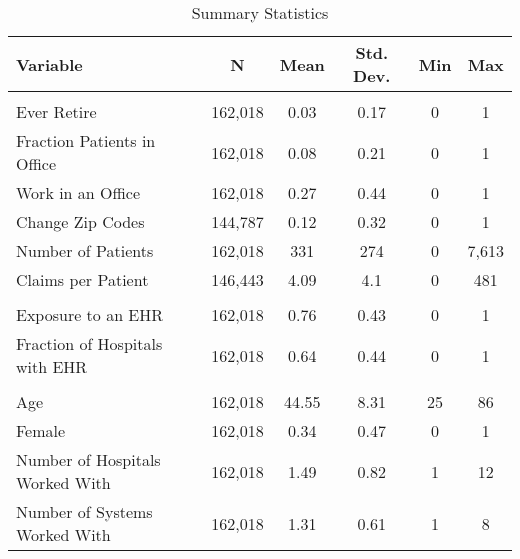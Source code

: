 


\begin{table}[ht]

\caption{Summary Statistics \label{tab:sumstats}}
\centering
\begin{tabular}[t]{lccccc}
\toprule
Variable & N & Mean & Std. Dev. & Min & Max\\
\midrule
\addlinespace[0.3em]
\multicolumn{6}{l}{\textbf{Outcomes}}\\
\hspace{1em}Ever Retire & 162,018 & 0.03 & 0.17 & 0 & 1\\
\hspace{1em}Fraction Patients in Office & 162,018 & 0.08 & 0.21 & 0 & 1\\
\hspace{1em}Work in an Office & 162,018 & 0.27 & 0.44 & 0 & 1\\
\hspace{1em}Change Zip Codes & 144,787 & 0.12 & 0.32 & 0 & 1\\
\hspace{1em}Number of Patients & 162,018 & 331 & 274 & 0 & 7,613\\
\hspace{1em}Claims per Patient & 146,443 & 4.09 & 4.1 & 0 & 481\\
\addlinespace[0.3em]
\multicolumn{6}{l}{\textbf{Treatment}}\\
\hspace{1em}Exposure to an EHR & 162,018 & 0.76 & 0.43 & 0 & 1\\
\hspace{1em}Fraction of Hospitals with EHR & 162,018 & 0.64 & 0.44 & 0 & 1\\
\addlinespace[0.3em]
\multicolumn{6}{l}{\textbf{Characteristics}}\\
\hspace{1em}Age & 162,018 & 44.55 & 8.31 & 25 & 86\\
\hspace{1em}Female & 162,018 & 0.34 & 0.47 & 0 & 1\\
\hspace{1em}Number of Hospitals Worked With & 162,018 & 1.49 & 0.82 & 1 & 12\\
\hspace{1em}Number of Systems Worked With & 162,018 & 1.31 & 0.61 & 1 & 8\\
\bottomrule
\end{tabular}
\end{table}
